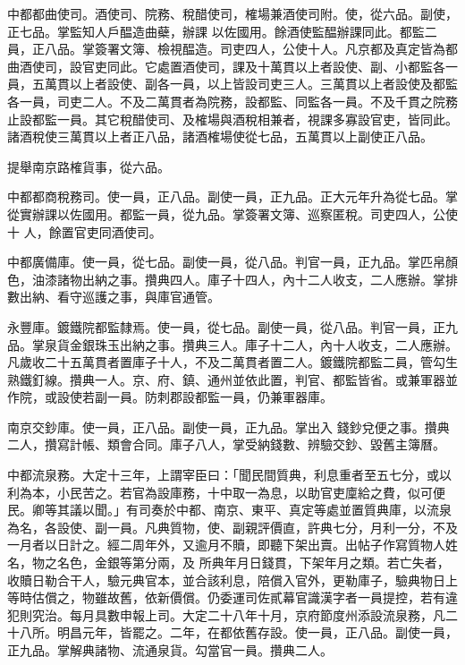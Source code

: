 \begin{pinyinscope}
 中都都曲使司。酒使司、院務、稅醋使司，榷場兼酒使司附。使，從六品。副使，正七品。掌監知人戶醖造曲蘗，辦課
 以佐國用。餘酒使監醖辦課同此。都監二員，正八品。掌簽署文簿、檢視醖造。司吏四人，公使十人。凡京都及真定皆為都曲酒使司，設官吏同此。它處置酒使司，課及十萬貫以上者設使、副、小都監各一員，五萬貫以上者設使、副各一員，以上皆設司吏三人。三萬貫以上者設使及都監各一員，司吏二人。不及二萬貫者為院務，設都監、同監各一員。不及千貫之院務止設都監一員。其它稅醋使司、及榷場與酒稅相兼者，視課多寡設官吏，皆同此。諸酒稅使三萬貫以上者正八品，諸酒榷場使從七品，五萬貫以上副使正八品。



 提舉南京路榷貨事，從六品。



 中都都商稅務司。使一員，正八品。副使一員，正九品。正大元年升為從七品。掌從實辦課以佐國用。都監一員，從九品。掌簽署文簿、巡察匿稅。司吏四人，公使十
 人，餘置官吏同酒使司。



 中都廣備庫。使一員，從七品。副使一員，從八品。判官一員，正九品。掌匹帛顏色，油漆諸物出納之事。攢典四人。庫子十四人，內十二人收支，二人應辦。掌排數出納、看守巡護之事，與庫官通管。



 永豐庫。鍍鐵院都監隸焉。使一員，從七品。副使一員，從八品。判官一員，正九品。掌泉貨金銀珠玉出納之事。攢典三人。庫子十二人，內十人收支，二人應辦。凡歲收二十五萬貫者置庫子十人，不及二萬貫者置二人。鍍鐵院都監二員，管勾生熟鐵釘線。攢典一人。京、府、鎮、通州並依此置，判官、都監皆省。或兼軍器並作院，或設使若副一員。防刺郡設都監一員，仍兼軍器庫。



 南京交鈔庫。使一員，正八品。副使一員，正九品。掌出入
 錢鈔兌便之事。攢典二人，攢寫計帳、類會合同。庫子八人，掌受納錢數、辨驗交鈔、毀舊主簿曆。



 中都流泉務。大定十三年，上謂宰臣曰：「聞民間質典，利息重者至五七分，或以利為本，小民苦之。若官為設庫務，十中取一為息，以助官吏廩給之費，似可便民。卿等其議以聞。」有司奏於中都、南京、東平、真定等處並置質典庫，以流泉為名，各設使、副一員。凡典質物，使、副親評價直，許典七分，月利一分，不及一月者以日計之。經二周年外，又逾月不贖，即聽下架出賣。出帖子作寫質物人姓名，物之名色，金銀等第分兩，及
 所典年月日錢貫，下架年月之類。若亡失者，收贖日勒合干人，驗元典官本，並合該利息，陪償入官外，更勒庫子，驗典物日上等時估償之，物雖故舊，依新價償。仍委運司佐貳幕官識漢字者一員提控，若有違犯則究治。每月具數申報上司。大定二十八年十月，京府節度州添設流泉務，凡二十八所。明昌元年，皆罷之。二年，在都依舊存設。使一員，正八品。副使一員，正九品。掌解典諸物、流通泉貨。勾當官一員。攢典二人。




\end{pinyinscope}
